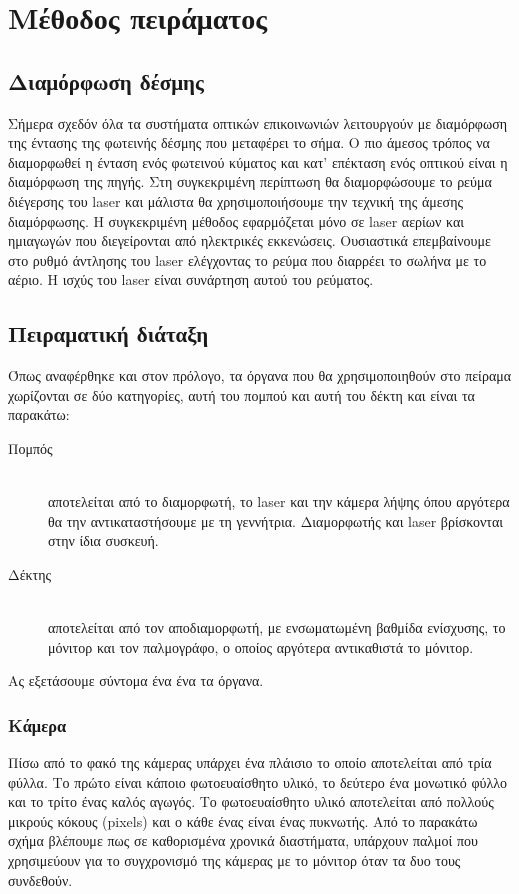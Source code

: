 \documentclass[a4paper,11pt,titlepage]{article}
\begin{document}
\section{Μέθοδος πειράματος}
\subsection{Διαμόρφωση δέσμης}
Σήμερα σχεδόν όλα τα συστήματα οπτικών επικοινωνιών λειτουργούν με διαμόρφωση της έντασης της φωτεινής δέσμης που μεταφέρει το σήμα. Ο πιο άμεσος τρόπος να διαμορφωθεί η ένταση ενός φωτεινού κύματος και κατ' επέκταση ενός οπτικού είναι η διαμόρφωση της πηγής. Στη συγκεκριμένη περίπτωση θα διαμορφώσουμε το ρεύμα διέγερσης του laser και μάλιστα θα χρησιμοποιήσουμε την τεχνική της άμεσης διαμόρφωσης. Η συγκεκριμένη μέθοδος εφαρμόζεται μόνο σε laser αερίων και ημιαγωγών που διεγείρονται από ηλεκτρικές εκκενώσεις. Ουσιαστικά επεμβαίνουμε στο ρυθμό άντλησης του laser ελέγχοντας το ρεύμα που διαρρέει το σωλήνα με το αέριο. Η ισχύς του laser είναι συνάρτηση αυτού του ρεύματος.
\subsection{Πειραματική διάταξη}
Όπως αναφέρθηκε και στον πρόλογο, τα όργανα που θα χρησιμοποιηθούν στο πείραμα χωρίζονται σε δύο κατηγορίες, αυτή του πομπού και αυτή του δέκτη και είναι τα παρακάτω:
\begin{description}

	\item[Πομπός] \hfill \\
	αποτελείται από το διαμορφωτή, το laser και την κάμερα λήψης όπου αργότερα θα την αντικαταστήσουμε με τη γεννήτρια. Διαμορφωτής και laser βρίσκονται στην ίδια συσκευή.

	\item[Δέκτης] \hfill \\
	αποτελείται από τον αποδιαμορφωτή, με ενσωματωμένη βαθμίδα ενίσχυσης, το μόνιτορ και τον παλμογράφο, ο οποίος αργότερα αντικαθιστά το μόνιτορ.

\end{description}

Ας εξετάσουμε σύντομα ένα ένα τα όργανα.

\subsubsection{Κάμερα}
Πίσω από το φακό της κάμερας υπάρχει ένα πλάισιο το οποίο αποτελείται από τρία φύλλα. Το πρώτο είναι κάποιο φωτοευαίσθητο υλικό, το δεύτερο ένα μονωτικό φύλλο και το τρίτο ένας καλός αγωγός. Το φωτοευαίσθητο υλικό αποτελείται από πολλούς μικρούς κόκους (pixels) και ο κάθε ένας είναι ένας πυκνωτής. Από το παρακάτω σχήμα βλέπουμε πως σε καθορισμένα χρονικά διαστήματα, υπάρχουν παλμοί που χρησιμεύουν για το συγχρονισμό της κάμερας με το μόνιτορ όταν τα δυο τους συνδεθούν.
\end{document}
